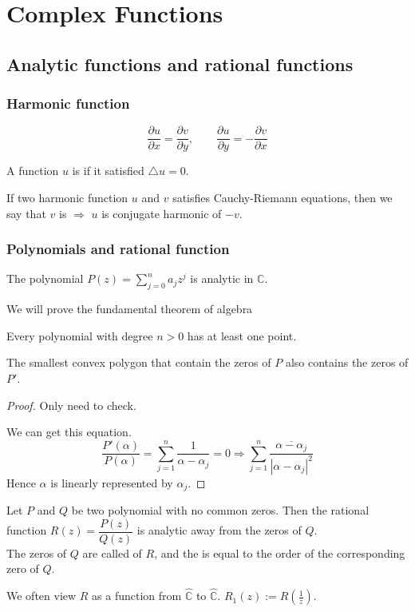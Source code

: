 
\section{Complex Functions}
\subsection{Analytic functions and rational functions}
\subsubsection{Harmonic function}
\begin{definition}
    \[\frac{\partial u}{\partial x}=\frac{\partial v}{\partial y},\qquad\frac{\partial u }{\partial y}=-\frac{\partial v}{\partial x}\]
\end{definition}
\begin{definition}
    A function  $ u  $ is  if it satisfied   $ \triangle u=0 $. 
    
    If two harmonic function  $ u  $ and  $ v  $ satisfies Cauchy-Riemann equations, then we say that  $ v  $ is  $ \Rightarrow  $  $ u  $ is conjugate harmonic of  $ -v  $.
\end{definition}
\subsubsection{Polynomials and  rational function}
The polynomial  $ P(z)=\sum\limits_{j=0}^na_jz^j $ is analytic in  $ \mathbb{C} $.

We will prove the fundamental theorem of algebra
\begin{theorem}
    Every polynomial with degree  $ n>0 $ has at least one point. 
\end{theorem} 
\begin{theorem}
    The smallest convex polygon that contain the zeros of  $ P  $ also contains the zeros of  $ P' $. 
\end{theorem}
\begin{proof}
    Only need to check.
    
    We can get this equation.
    \[\frac{P'(\alpha)}{P(\alpha)}=\sum\limits_{j=1}^n\frac{1 }{\alpha-\alpha_j}=0\Rightarrow \sum\limits_{j=1}^n\frac{\overline{\alpha-\alpha_j}}{|\alpha-\alpha_j|^2}\]
    Hence  $ \alpha  $ is linearly represented by  $ \alpha_j $.
\end{proof}
\begin{proposition}
    Let  $ P  $ and  $ Q  $ be two polynomial with no common zeros. Then the rational function  $ R(z)=\dfrac{P(z)}{Q(z)} $ is analytic away from the zeros of  $ Q $.\\
    The zeros of  $ Q  $ are called  of  $ R  $, and the  is equal to the order of the corresponding zero of  $ Q  $. 
\end{proposition}
We often view  $ R  $ as a function from  $ \hat{\mathbb{C}} $ to  $ \hat{\mathbb{C}} $.  $ R_1(z):=R(\frac{1}{z}) $.

